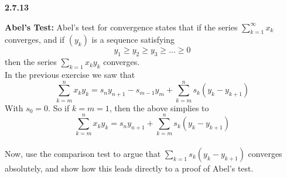 \textbf{2.7.13}

\textbf{Abel's Test:}
Abel's test for convergence states that if the series $\sum^{\infty}_{k=1} x_k$ converges,
and if $(y_k)$ is a sequence satisfying
$$
y_1 \geq y_2 \geq y_3 \geq \ldots \geq 0
$$
then the series $\sum_{k=1} x_k y_k$ converges.
\\

In the previous exercise we saw that
$$
\sum^{n}_{k=m} x_k y_k = s_n y_{n+1} - s_{m-1}y_m + \sum^{n}_{k=m} s_k (y_k - y_{k+1})
$$
With $s_0 = 0$.
So if $k=m=1$, then the above simplies to
$$
\sum^{n}_{k=m} x_k y_k = s_n y_{n+1} + \sum^{n}_{k=m} s_k (y_k - y_{k+1})
$$
\\

Now, use the comparison test to argue that $\sum_{k=1} s_k (y_k - y_{k+1})$ converges absolutely,
and show how this leads directly to a proof of Abel's test.
\\